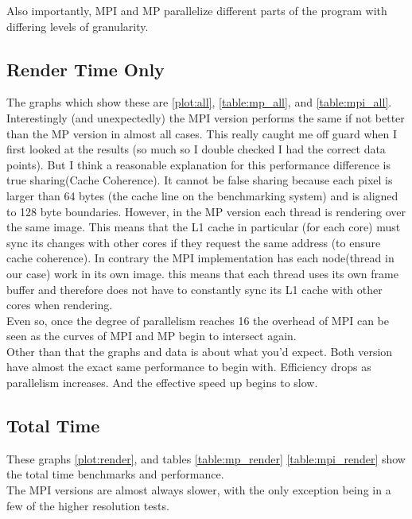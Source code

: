 \documentclass[12pt]{article}
\begin{document}
Also importantly, MPI and MP parallelize different parts of the program with differing levels of granularity. 

\subsection{Render Time Only}

The graphs which show these are \ref{plot:all}, \ref{table:mp_all}, and \ref{table:mpi_all}. Interestingly (and unexpectedly) the MPI version performs the same if not better than the MP version in almost all cases. This really caught me off guard when I first looked at the results (so much so I double checked I had the correct data points). But I think a reasonable explanation for this performance difference is true sharing(Cache Coherence). It cannot be false sharing because each pixel is larger than 64 bytes (the cache line on the benchmarking system) and is aligned to 128 byte boundaries. However, in the MP version each thread is rendering over the same image. This means that the L1 cache in particular (for each core) must sync its changes with other cores if they request the same address (to ensure cache coherence). In contrary the MPI implementation has each node(thread in our case) work in its own image. this means that each thread uses its own frame buffer and therefore does not have to constantly sync its L1 cache with other cores when rendering. \\

Even so, once the degree of parallelism reaches 16 the overhead of MPI can be seen as the curves of MPI and MP begin to intersect again.\\

Other than that the graphs and data is about what you'd expect. Both version have almost the exact same performance to begin with. Efficiency drops as parallelism increases. And the effective speed up begins to slow. \\
 
\subsection{Total Time}

These graphs \ref{plot:render}, and tables \ref{table:mp_render} \ref{table:mpi_render} show the total time benchmarks and performance.\\

The MPI versions are almost always slower, with the only exception being in a few of the higher resolution tests.\\
\end{document}
